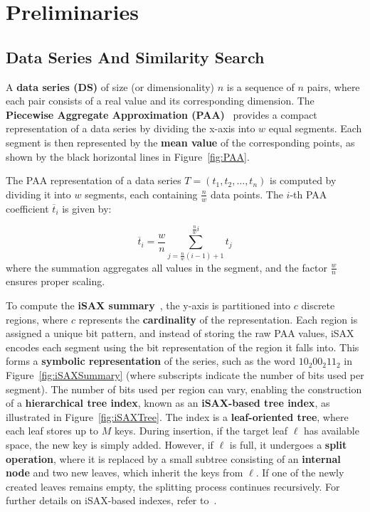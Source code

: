 \chapter{Preliminaries}
\label{chapter:prelemenaries}

\vspace{-0.5cm}
\section{Data Series And Similarity Search}

A \textbf{data series (DS)} of size (or dimensionality) \( n \) is a sequence 
of \( n \) pairs, where each pair consists of a real value and its corresponding 
dimension.
% 
The \textbf{Piecewise Aggregate Approximation (PAA)}~\cite{DBLP:journals/kais/KeoghCPM01} 
provides a compact representation of a data series by dividing the x-axis into 
\( w \) equal segments. Each segment is then represented by the \textbf{mean value} 
of the corresponding points, as shown by the black horizontal lines in 
Figure~\ref{fig:PAA}. 
% 

The PAA representation of a data series \( T = (t_1, t_2, \dots, t_n) \) is computed by 
dividing it into \( w \) segments, each containing \( \frac{n}{w} \) data points. The 
\( i \)-th PAA coefficient \( \overline{t}_i \) is given by:  

\begin{equation}
\overline{t}_i = \frac{w}{n} \sum_{j=\frac{n}{w} (i-1) + 1}^{\frac{n}{w} i} t_j
\label{eq:paa-transformation}
\end{equation}
% 
where the summation aggregates all values in the segment, and the factor \( \frac{w}{n} \) 
ensures proper scaling.  

% 
To compute the \textbf{iSAX summary}~\cite{shieh2008sax}, the y-axis is partitioned 
into \( c \) discrete regions, where \( c \) represents the \textbf{cardinality} 
of the representation.
%
Each region is assigned a unique bit pattern, and instead of storing the raw PAA values, 
iSAX encodes each segment using the bit representation of the region it falls into. 
This forms a \textbf{symbolic representation} of the series, 
such as the word \( 10_2 00_2 11_2 \) in Figure~\ref{fig:iSAXSummary} 
(where subscripts indicate the number of bits used per segment).
% 
The number of bits used per region can vary, enabling the construction of a 
\textbf{hierarchical tree index}, known as an \textbf{iSAX-based tree index}, as 
illustrated in Figure~\ref{fig:iSAXTree}.
The index is a \textbf{leaf-oriented tree}, where each leaf stores up to \( M \) keys.
% 
During insertion, if the target leaf \( \ell \) has available space, the new key 
is simply added. However, if \( \ell \) is full, it undergoes a \textbf{split operation},
where it is replaced by a small subtree consisting of an \textbf{internal node} and two 
new leaves, which inherit  the keys from \( \ell \). If one of the newly created leaves
remains empty, the splitting process continues recursively.
For further details on iSAX-based indexes, refer to~\cite{isaxfamily}.


